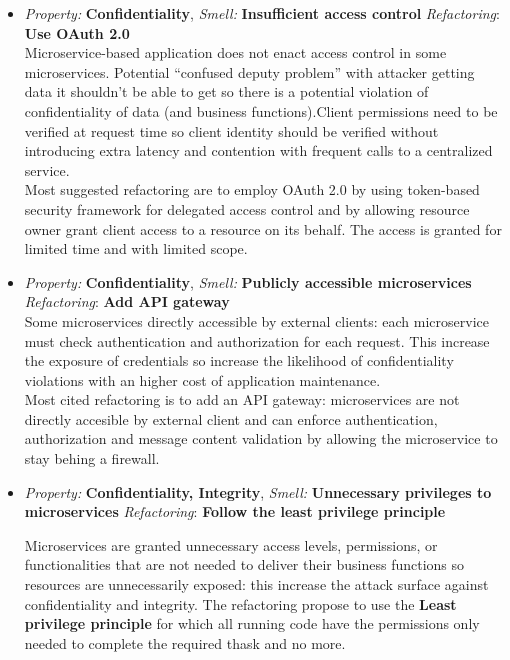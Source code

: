 \documentclass[10pt,a4paper]{report}
\begin{document}
\begin{itemize}
	\item \textit{Property: } \textbf{Confidentiality}, \textit{Smell:} \textbf{Insufficient access control} \textit{Refactoring}: \textbf{Use OAuth 2.0} \\
	 Microservice-based application does not enact access control in some microservices. Potential “confused deputy problem” with attacker getting data it shouldn’t be able to get so there is a potential violation of confidentiality of data (and business functions).Client permissions need to be verified at request time so client identity should be verified without introducing extra latency and contention with frequent calls to a centralized service. \\
	 Most suggested refactoring are to employ OAuth 2.0
	 by using token-based security framework for delegated access control and by allowing resource owner grant client access to a resource on its behalf. The access is granted for limited time and with limited scope. 
	 
	 \item \textit{Property: } \textbf{Confidentiality}, \textit{Smell:} \textbf{Publicly accessible microservices} \textit{Refactoring}: \textbf{Add API gateway} \\
	 Some microservices directly accessible by external clients: each microservice must check authentication and authorization for each request. This increase the exposure of credentials so increase the likelihood of confidentiality violations with an higher cost of application maintenance.\\
	 Most cited refactoring is to add an API gateway: microservices are not directly accesible by external client and can enforce authentication, authorization and message content validation by allowing the microservice to stay behing a firewall. 
	 
	 \item \textit{Property: } \textbf{Confidentiality, Integrity}, \textit{Smell:} \textbf{Unnecessary privileges to microservices} \textit{Refactoring}: \textbf{Follow the least privilege principle} 
	 
	 Microservices are granted unnecessary access levels, permissions, or functionalities that are not
	 needed to deliver their business functions so resources are unnecessarily exposed: this increase the attack surface against confidentiality and integrity. The refactoring propose to use the \textbf{Least privilege principle} for which all running code have the permissions only needed to complete the required thask and no more. 
	 

\end{itemize}
\end{document}

